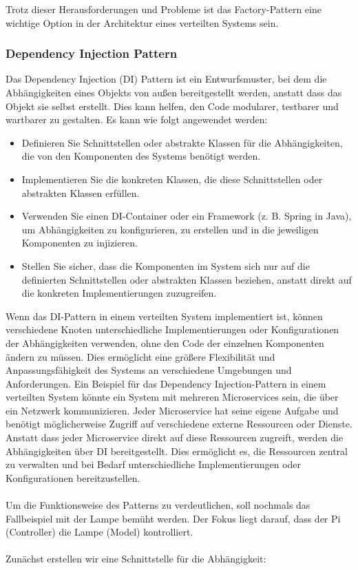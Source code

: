 \documentclass[../vs-script-first-v01.tex]{subfiles}
\begin{document}
Trotz dieser Herausforderungen und Probleme ist das Factory-Pattern eine wichtige Option in der Architektur eines verteilten Systems sein. 

\subsubsection{Dependency Injection Pattern}

Das Dependency Injection (DI) Pattern ist ein Entwurfsmuster, bei dem die Abhängigkeiten eines Objekts von außen bereitgestellt werden, anstatt dass das Objekt sie selbst erstellt. Dies kann helfen, den Code modularer, testbarer und wartbarer zu gestalten. Es kann wie folgt angewendet werden:
\begin{itemize}
\item Definieren Sie Schnittstellen oder abstrakte Klassen für die Abhängigkeiten, die von den Komponenten des Systems benötigt werden.
\item Implementieren Sie die konkreten Klassen, die diese Schnittstellen oder abstrakten Klassen erfüllen.
\item Verwenden Sie einen DI-Container oder ein Framework (z. B. Spring in Java), um Abhängigkeiten zu konfigurieren, zu erstellen und in die jeweiligen Komponenten zu injizieren.
\item Stellen Sie sicher, dass die Komponenten im System sich nur auf die definierten Schnittstellen oder abstrakten Klassen beziehen, anstatt direkt auf die konkreten Implementierungen zuzugreifen.
\end{itemize}    
Wenn das DI-Pattern in einem verteilten System implementiert ist, können verschiedene Knoten unterschiedliche Implementierungen oder Konfigurationen der Abhängigkeiten verwenden, ohne den Code der einzelnen Komponenten ändern zu müssen. Dies ermöglicht eine größere Flexibilität und Anpassungsfähigkeit des Systems an verschiedene Umgebungen und Anforderungen. Ein Beispiel für das Dependency Injection-Pattern in einem verteilten System könnte ein System mit mehreren Microservices sein, die über ein Netzwerk kommunizieren. Jeder Microservice hat seine eigene Aufgabe und benötigt möglicherweise Zugriff auf verschiedene externe Ressourcen oder Dienste. Anstatt dass jeder Microservice direkt auf diese Ressourcen zugreift, werden die Abhängigkeiten über DI bereitgestellt. Dies ermöglicht es, die Ressourcen zentral zu verwalten und bei Bedarf unterschiedliche Implementierungen oder Konfigurationen bereitzustellen.
\\\\
Um die Funktionsweise des Patterns zu verdeutlichen, soll nochmals das Fallbeispiel mit der Lampe bemüht werden. Der Fokus liegt darauf, dass der Pi (Controller) die Lampe (Model) kontrolliert. 
\\\\
Zunächst erstellen wir eine Schnittstelle für die Abhängigkeit:\\
\end{document}
